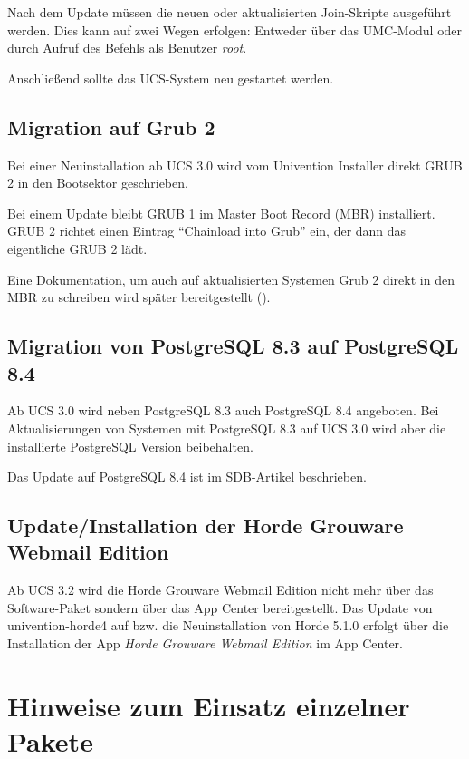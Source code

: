 Nach dem Update müssen die neuen oder aktualisierten Join-Skripte
ausgeführt werden. Dies kann auf zwei Wegen erfolgen: Entweder über
das UMC-Modul  oder durch Aufruf des
Befehls  als
Benutzer \emph{root}.

Anschließend sollte das UCS-System neu gestartet werden.

\section{Migration auf Grub 2}

Bei einer Neuinstallation ab UCS 3.0 wird vom Univention Installer direkt GRUB 2 in den
Bootsektor geschrieben.

Bei einem Update bleibt GRUB 1 im Master Boot Record (MBR) installiert. GRUB 2
richtet einen Eintrag ``Chainload into Grub'' ein, der dann das eigentliche
GRUB 2 lädt.

Eine Dokumentation, um auch auf aktualisierten Systemen Grub 2 direkt
in den MBR zu schreiben wird später bereitgestellt ().

\section{Migration von PostgreSQL 8.3 auf PostgreSQL 8.4}
Ab UCS 3.0 wird neben PostgreSQL 8.3 auch PostgreSQL 8.4
angeboten. Bei Aktualisierungen von Systemen mit PostgreSQL 8.3 auf
UCS 3.0 wird aber die installierte PostgreSQL Version beibehalten.

Das Update auf PostgreSQL 8.4 ist im
SDB-Artikel  beschrieben.

\section{Update/Installation der Horde Grouware Webmail Edition}

Ab UCS 3.2 wird die Horde Grouware Webmail Edition nicht mehr über das
Software-Paket  sondern über das App Center
bereitgestellt. Das Update von univention-horde4 auf bzw. die Neuinstallation
von Horde 5.1.0 erfolgt über die Installation der App \emph{Horde Grouware Webmail
Edition} im App Center.

\chapter{Hinweise zum Einsatz einzelner Pakete}

